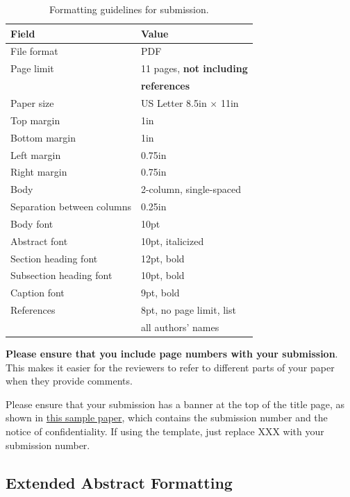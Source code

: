 \documentclass[pageno]{jpaper}
\begin{document}
\begin{table}[h!]
  \centering
  \begin{tabular}{|l|l|}
    \hline
    \textbf{Field} & \textbf{Value}\\
    \hline
    \hline
    File format & PDF \\
    \hline
    Page limit & 11 pages, {\bf not including}\\
               & {\bf references}\\
    \hline
    Paper size & US Letter 8.5in $\times$ 11in\\
    \hline
    Top margin & 1in\\
    \hline
    Bottom margin & 1in\\
    \hline
    Left margin & 0.75in\\
    \hline
    Right margin & 0.75in\\
    \hline
    Body & 2-column, single-spaced\\
    \hline
    Separation between columns & 0.25in\\
    \hline
    Body font & 10pt\\
    \hline
    Abstract font & 10pt, italicized\\
    \hline
    Section heading font & 12pt, bold\\
    \hline
    Subsection heading font & 10pt, bold\\
    \hline
    Caption font & 9pt, bold\\
    \hline
    References & 8pt, no page limit, list \\
               & all authors' names\\
    \hline
  \end{tabular}
  \caption{Formatting guidelines for submission. }
  \label{table:formatting}
\end{table}

\textbf{Please ensure that you include page numbers with your
submission}. This makes it easier for the reviewers to refer to different
parts of your paper when they provide comments.

Please ensure that your submission has a banner at the top of the title
page, as shown in
\href{https://asplos-conference.org/wp-content/uploads/2020/06/asplos21-paper-template.pdf}{this
sample paper}, which contains the submission number and the notice of
confidentiality.  If using the template, just replace XXX with your
submission number.

\subsection{Extended Abstract Formatting}
\end{document}
